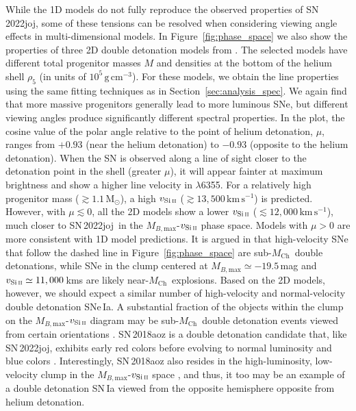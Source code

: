 \documentclass[twocolumn]{aastex631}
\newcommand{\sn}{SN\,2022joj}
\newcommand{\Mch}{$M_\mathrm{Ch}$}
\newcommand{\kms}{$\mathrm{km}\,\mathrm{s}^{-1}$}
\newcommand{\chang}[1]{\textcolor{blue}{[Chang: #1]}}
\begin{document}
\begin{CJK*}{UTF8}{gbsn}
While the 1D models do not fully reproduce the observed properties of \sn, some of these tensions can be resolved when considering viewing angle effects in multi-dimensional models. In Figure~\ref{fig:phase_space} we also show the properties of three 2D double detonation models from \citet{Shen_2D_2021}. The selected models have different total progenitor masses $M$ and densities at the bottom of the helium shell $\rho_5$ (in units of $\mathrm{10^5\,g\,cm^{-3}}$). For these models, we obtain the  line properties using the same fitting techniques as in Section~\ref{sec:analysis_spec}. We again find that more massive progenitors generally lead to more luminous SNe, but different viewing angles produce significantly different spectral properties. In the plot, the cosine value of the polar angle relative to the point of helium detonation, $\mu$, ranges from $+0.93$ (near the helium detonation) to $-0.93$ (opposite to the helium detonation). When the SN is observed along a line of sight closer to the detonation point in the shell (greater $\mu$), it will appear fainter at maximum brightness and show a higher line velocity in  $\lambda$6355. For a relatively high progenitor mass ($\gtrsim$$1.1\,\mathrm{M_\odot}$), a high $v_\mathrm{Si\,\textsc{ii}}$ ($\gtrsim$$13,500$\,\kms) is predicted. However, with $\mu\lesssim0$, all the 2D models show a lower $v_\mathrm{Si\,\textsc{ii}}$ ($\lesssim$$12,000$\,\kms), much closer to \sn\ in the $M_{B,\mathrm{max}}$-$v_\mathrm{Si\,\textsc{ii}}$ phase space. Models with $\mu>0$ are more consistent with 1D model predictions. It is argued in \citep{polin_observational_2019} that high-velocity SNe that follow the dashed line in Figure~\ref{fig:phase_space} are sub-\Mch\ double detonations, while SNe in the clump centered at $M_{B,\mathrm{max}}\simeq-19.5$\,mag and $v_\mathrm{Si\,\textsc{ii}}\simeq11,000$\,kms are likely near-\Mch\ explosions. Based on the 2D models, however, we should expect a similar number of high-velocity and normal-velocity double detonation SNe\,Ia. A substantial fraction of the objects within the clump on the $M_{B,\mathrm{max}}$-$v_\mathrm{Si\,\textsc{ii}}$ diagram may be sub-\Mch\ double detonation events viewed from certain orientations \citep{Shen_2D_2021}. %
SN\,2018aoz is a double detonation candidate that, like \sn, exhibits early red colors before evolving to normal luminosity and blue colors \citep{Ni_2022}. Interestingly, SN\,2018aoz also resides in the high-luminosity, low-velocity clump in the $M_{B,\mathrm{max}}$-$v_\mathrm{Si\,\textsc{ii}}$ space \citep{Ni_18aoz_2023}, and thus, it too may be an example of a double detonation SN\,Ia viewed from the opposite hemisphere opposite from helium detonation.


\end{CJK*}
\end{document}
